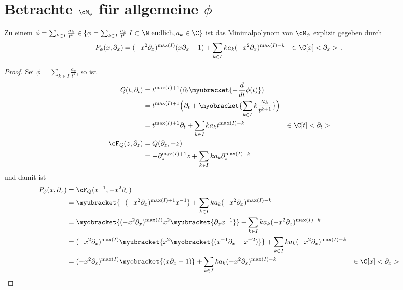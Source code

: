 \section{Betrachte $\cM_\phi$ für allgemeine $\phi$}
\label{sec:allgemeinProblem}
\begin{lem}
Zu einem $\phi=\sum_{k\in I}\frac{a_k}{t^{k}}\in \{\phi=\sum_{k\in
I}\frac{a_k}{t^{k}}|I\subset\N\mbox{ endlich} ,a_k\in \C\}$ ist das
Minimalpolynom von $\cM_\phi$ explizit gegeben durch
\begin{align*}
P_{\phi}(x,\partial_x) &=(-x^2\partial_x)^{\max(I)} (x\partial_x-1)
   +\sum_{k\in I}k a_k(-x^2\partial_x)^{\max(I)-k} & \in \C[x]<\partial_x> \,.
\end{align*}
\end{lem}
\begin{proof}
Sei $\phi=\sum_{k\in I}\frac{a_k}{t^{k}}$, so ist
\begin{align*}
Q(t,\partial_t) &= t^{\max(I)+1}(\partial_t\myubracket{-\frac{d}{dt}\phi(t)})
\\&=t^{\max(I)+1}\Big(
    \partial_t+\myobracket{\sum_{k\in I} k\frac{a_k}{t^{k+1}}}\Big)
\\&=t^{\max(I)+1}\partial_t +\sum_{k\in I}k a_k t^{\max(I)-k}
  & \in \C[t]<\partial_t>
\\\cF_Q(z,\partial_z) &=Q(\partial_z,-z)
\\&=-\partial_z^{\max(I)+1}z +\sum_{k\in I}k a_k\partial_z^{\max(I)-k}
\end{align*}
und damit ist
\begin{align*}
P_{\phi}(x,\partial_x) &=\cF_Q(x^{-1},-x^2\partial_x)
\\&=\myubracket{-(-x^2\partial_x)^{\max(I)+1}x^{-1}}
  +\sum_{k\in I}k a_k(-x^2\partial_x)^{\max(I)-k}
\\&=\myobracket{(-x^2\partial_x)^{\max(I)} x^2\myubracket{\partial_xx^{-1}}}
   +\sum_{k\in I}k a_k(-x^2\partial_x)^{\max(I)-k}
\\&=(-x^2\partial_x)^{\max(I)}
   \myubracket{ x^2 \myobracket{(x^{-1}\partial_x-x^{-2})} }
   +\sum_{k\in I}k a_k(-x^2\partial_x)^{\max(I)-k}
\\&=(-x^2\partial_x)^{\max(I)} \myobracket{(x\partial_x-1)}
   +\sum_{k\in I}k a_k(-x^2\partial_x)^{\max(I)-k}
  & \in \C[x]<\partial_x>
\end{align*}
\end{proof}
\begin{comment}
Im Anhang \ref{chap:zu-rezept} wird das $(x^2\partial_x)^{k}$ genauer
diskutiert. Dies führt aber hier an dieser Stelle nicht mehr weiter in die
gewünschte Richtung.
\end{comment}
